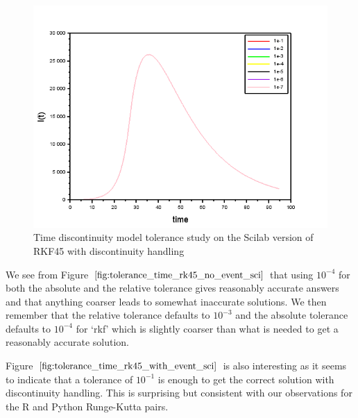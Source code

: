 \begin{figure}[H]
\centering
\includegraphics[width=0.7\linewidth]{./figures/tolerance_time_rk45_with_event_sci}
\caption{Time discontinuity model tolerance study on the Scilab version of RKF45 with discontinuity handling}
\label{fig:tolerance_time_rk45_with_event_sci}
\end{figure}

We see from Figure $\ref{fig:tolerance_time_rk45_no_event_sci}$ that using $10^{-4}$ for both the absolute and the relative tolerance gives reasonably accurate answers and that anything coarser leads to somewhat inaccurate solutions. We then remember that the relative tolerance defaults to $10^{-3}$ and the absolute tolerance defaults to $10^{-4}$ for `rkf' which is slightly coarser than what is needed to get a reasonably accurate solution.

Figure $\ref{fig:tolerance_time_rk45_with_event_sci}$ is also interesting as it seems to indicate that a tolerance of $10^{-1}$ is enough to get the correct solution with discontinuity handling. This is surprising but consistent with our observations for the R and Python Runge-Kutta pairs.

